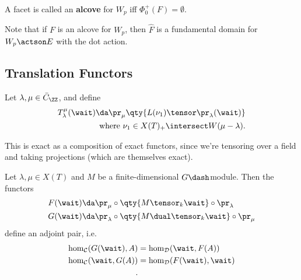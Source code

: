 \begin{definition}[Alcove]

A facet is called an \textbf{alcove} for \(W_p\) iff
\(\Phi_0^+(F) = \emptyset\).

\end{definition}

\begin{remark}

Note that if \(F\) is an alcove for \(W_p\), then \(\hat F\) is a
fundamental domain for \(W_p\actson E\) with the dot action.

\end{remark}

\hypertarget{translation-functors-1}{%
\subsection{Translation Functors}\label{translation-functors-1}}

Let \(\lambda, \mu\in \bar{C}_\ZZ\), and define
\begin{align*}  
T_\lambda^\mu(\wait) \da 
\pr_\mu \qty{ L(\nu_1) \tensor \pr_\lambda(\wait) }\\
\text{where } 
\nu_1 \in X(T)_+ \intersect W(\mu-\lambda)
.\end{align*}

This is exact as a composition of exact functors, since we're tensoring
over a field and taking projections (which are themselves exact).

\begin{lemma}[?]

Let \(\lambda,\mu\in X(T)\) and \(M\) be a finite-dimensional
\(G\dash\)module. Then the functors
\begin{align*}  
F(\wait) &\da \pr_\mu \circ \qty{M\tensor_k \wait} \circ \pr_\lambda \\
G(\wait) &\da \pr_\lambda \circ \qty{M\dual \tensor_k \wait} \circ \pr_\mu \\
\end{align*} define an adjoint pair, i.e.
\begin{align*}  
\hom_\mathcal{C}(G(\wait), A) &= \hom_\mathcal{D}(\wait, F(A)) \\
\hom_\mathcal{C}(\wait, G(A)) &= \hom_\mathcal{D}( F(\wait), \wait) \\
.\end{align*}

\end{lemma}

